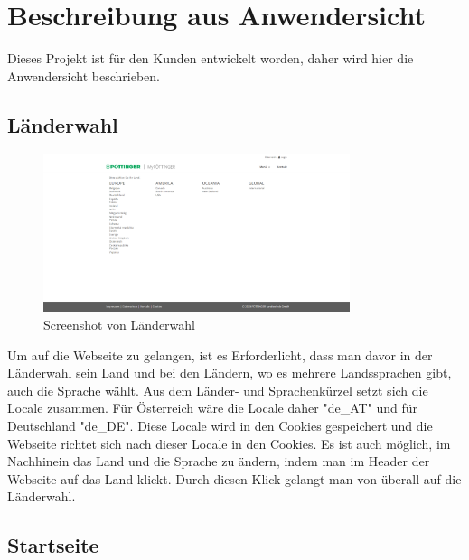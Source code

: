 \chapter{Beschreibung aus Anwendersicht} \label{anwendersicht}

Dieses Projekt ist für den Kunden entwickelt worden, daher wird hier die Anwendersicht beschrieben.

\section{Länderwahl}
\begin{figure}[h]
	\centerline{
		\includegraphics[width=0.8\textwidth]{./grafiken/erm_country_selection.png}
	}
	\vskip0pt
	\caption{Screenshot von Länderwahl} \label{fig:countrySelection}
\end{figure}
Um auf die Webseite zu gelangen, ist es Erforderlicht, dass man davor in der Länderwahl sein Land und bei den Ländern, wo es mehrere Landssprachen gibt, auch die Sprache wählt. Aus dem Länder- und Sprachenkürzel setzt sich die Locale zusammen. Für Österreich wäre die Locale daher "de\_AT" und für Deutschland "de\_DE". Diese Locale wird in den Cookies gespeichert und die Webseite richtet sich nach dieser Locale in den Cookies. Es ist auch möglich, im Nachhinein das Land und die Sprache zu ändern, indem man im Header der Webseite auf das Land klickt. Durch diesen Klick gelangt man von überall auf die Länderwahl.

\section{Startseite}
